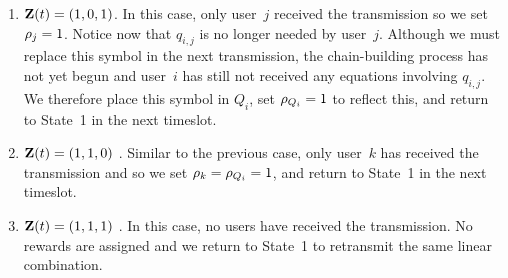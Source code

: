 \begin{LaTeXdescription}
\begin{enumerate}
		\item $\mathbf{Z}(t) = (1, 0, 1)$.  In this case, only user~$j$ received the transmission so we set $\rho_{j} = 1$.  Notice now that $q_{i, j}$ is no longer needed by user~$j$.  Although we must replace this symbol in the next transmission, the chain-building process has not yet begun and user~$i$ has still not received any equations involving $q_{i, j}$.  We therefore place this symbol in $Q_{i}$, set $\rho_{Q_{i}} = 1$ to reflect this, and return to State~1 in the next timeslot.
		\item $\mathbf{Z}(t) = (1, 1, 0)$	.  Similar to the previous case, only user~$k$ has received the transmission and so we set $\rho_{k} = \rho_{Q_{i}} = 1$, and return to State~1 in the next timeslot.
		\item $\mathbf{Z}(t) = (1, 1, 1)$	.  In this case, no users have received the transmission.  No rewards are assigned and we return to State~1 to retransmit the same linear combination.
	\end{enumerate}		
\end{LaTeXdescription}

